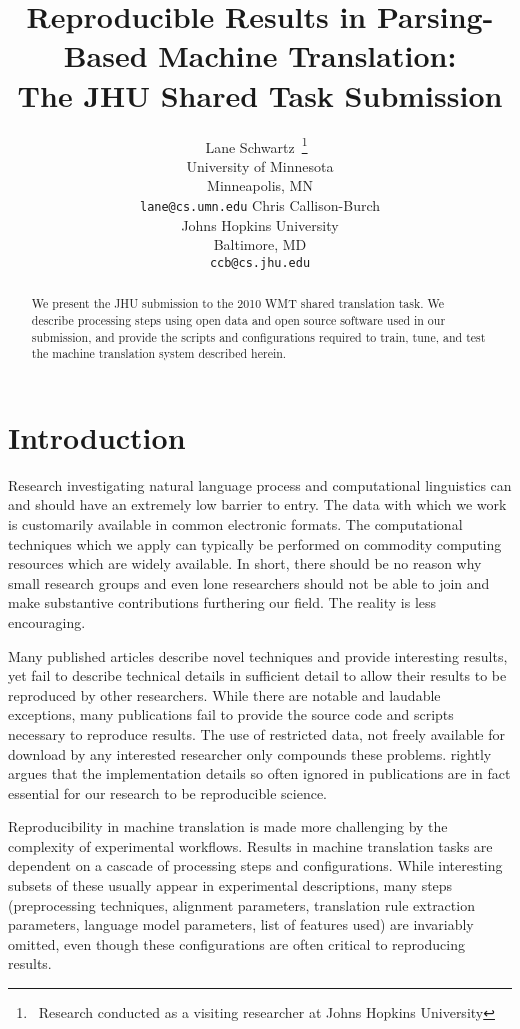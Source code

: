 \documentclass[11pt]{article}
\title{Reproducible Results in Parsing-Based Machine Translation:\\
The JHU Shared Task Submission}
\author{Lane Schwartz\
\thanks{\ Research conducted as a visiting researcher at Johns Hopkins University}\
\\University of Minnesota\\Minneapolis, MN\\
{\tt lane@cs.umn.edu} \And
Chris Callison-Burch \\
Johns Hopkins University \\
Baltimore, MD\\
{\tt ccb@cs.jhu.edu}}
\date{}
\begin{document}
\maketitle

\begin{abstract}
We present the JHU submission to the 2010 WMT shared translation task. We describe processing steps using open data and open source software used in our submission, and provide the scripts and configurations required to train, tune, and test the machine translation system described herein.
\end{abstract}


\section{Introduction}

Research investigating natural language process and computational linguistics can and should have an extremely low barrier to entry. The data with which we work is customarily available in common electronic formats. The computational techniques which we apply can typically be performed on commodity computing resources which are widely available. In short, there should be no reason why small research groups and even lone researchers should not be able to join and make substantive contributions furthering our field.
%
The reality is less encouraging. 

Many published articles describe novel techniques and provide interesting results, yet fail to describe technical details in sufficient detail to allow their results to be reproduced by other researchers. While there are notable and laudable exceptions, many publications fail to provide the source code and scripts necessary to reproduce results. The use of restricted data, not freely available for download by any interested researcher only compounds these problems.  rightly argues that the implementation details so often ignored in publications are in fact essential for our research to be reproducible science.

Reproducibility in machine translation is made more challenging by the complexity of experimental workflows. Results in machine translation tasks are dependent on a cascade of processing steps and configurations. While interesting subsets of these usually appear in experimental descriptions, many steps (preprocessing techniques, alignment parameters, translation rule extraction parameters, language model parameters, list of features used) are invariably omitted, even though these configurations are often critical to reproducing results.
\end{document}
